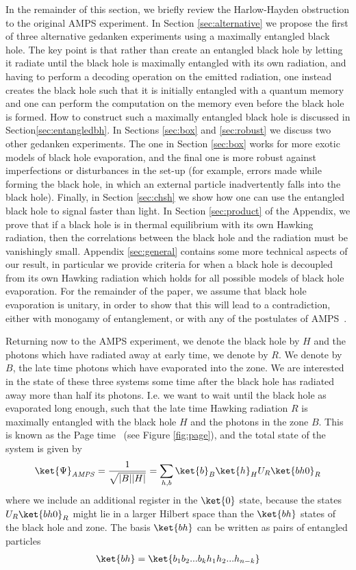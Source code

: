 \documentclass[12pt,a4paper]{article}
\begin{document}
In the remainder of this section, we briefly review the Harlow-Hayden obstruction to the original AMPS experiment. In Section \ref{sec:alternative} we propose the first of three alternative gedanken experiments using a maximally entangled black hole.  The key point is that rather than create an entangled black hole by letting it radiate until the black hole is maximally entangled with its own radiation, and having to perform a decoding operation on the emitted radiation, one instead creates the black hole such that it is initially entangled with a quantum memory and one can perform the computation on the memory even before the black hole is formed. How to construct such a maximally entangled black hole is discussed in Section\ref{sec:entangledbh}. In Sections \ref{sec:box} and \ref{sec:robust} we discuss two other gedanken experiments. The one in Section \ref{sec:box} works for more exotic models of black hole evaporation, and the final one is more robust against imperfections or disturbances in the set-up (for example, errors made while forming the black hole, in which an external particle inadvertently falls into the black hole). Finally, in Section \ref{sec:chsh} we show how one can use the entangled black hole to signal faster than light. In Section \ref{sec:product} of the Appendix, we prove that if a black hole is in thermal equilibrium with its own Hawking radiation, then the correlations between the black hole and the radiation must be vanishingly small.  Appendix \ref{sec:general} contains some more technical aspects of our result, in particular we provide criteria for when a black hole is decoupled from its own Hawking radiation which holds for all possible models of black hole evaporation. For the remainder of the paper, we assume that black hole evaporation is unitary, in order to show that this will lead to a contradiction, either with monogamy of entanglement, or with any of the postulates of AMPS~\cite{almheiri2013black}.
 
 
Returning now to the AMPS experiment, we denote the black hole by $H$ and the photons which have radiated away at early time, we denote by $R$. We denote by $B$, the late time photons which have evaporated into the zone. We are interested in the state of these three systems some time after the black hole has radiated away more than half its photons. I.e. we want to wait until the black hole as evaporated long enough, such that the late time Hawking radiation $R$ is maximally entangled with the black hole $H$ and the photons in the zone $B$. This is known as the Page time~\cite{page-unitary-evap} (see Figure \ref{fig:page}), and the total state of the system is given by
\begin{align}
\ket{\Psi}_{\mathit{AMPS}}=\frac{1}{\sqrt{|B||H|}}
=\sum_{h,b}\ket{b}_B\ket{h}_H U_R\ket{bh0}_{R}
\label{eq:hh}
\end{align}
where we include an additional register in the $\ket{0}$ state, because the states $U_R\ket{bh0}_{R}$ might lie in a larger Hilbert space than the $\ket{bh}$ states of the black hole and zone. The basis $\ket{bh}$ can be written as pairs of entangled particles 
\begin{align}
\ket{bh}=\ket{b_1b_2...b_kh_1h_2...h_{n-k}}
\end{align}
\end{document}
